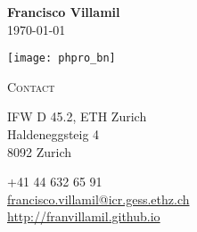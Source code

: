 \documentclass[a4paper, 11pt]{article}
\begin{document}
\renewcommand{\thepage}{\small \arabic{page}/2}


\begin{minipage}[ht]{0.65\textwidth}
\begin{flushright}
  {\bfseries\huge Francisco Villamil}\\\vspace{5pt}
  \today %
\end{flushright}
\end{minipage}
\hfill
\begin{minipage}[ht]{0.25\textwidth}
\texttt{[image: phpro\_bn]}
\end{minipage}



\vspace{25pt}

\noindent
\begin{minipage}[t]{0.14\textwidth}
	\flushleft
  \textsc{\small Contact}
\end{minipage}
\begin{minipage}[t]{0.86\textwidth}
	\begin{minipage}[t]{0.55\textwidth}
    IFW D 45.2, ETH Zurich\\
		Haldeneggsteig 4\\
		8092 Zurich\\
	\end{minipage}
	\begin{minipage}[t]{0.45\textwidth}
		 \hspace{5pt} +41 44 632 65 91\\
		 \hspace{5pt} \href{mailto:francisco.villamil@icr.gess.ethz.ch}{francisco.villamil@icr.gess.ethz.ch}\\
		 \hspace{5pt} \href{http://franvillamil.github.io}{http://franvillamil.github.io}\\
	\end{minipage}
\end{minipage}
\end{document}

